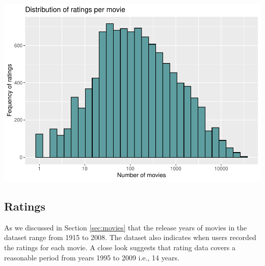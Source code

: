 \documentclass[]{article}
\newenvironment{Shaded}{\begin{snugshade}}{\end{snugshade}}
\newcommand{\CommentTok}[1]{\textcolor[rgb]{0.56,0.35,0.01}{\textit{#1}}}
\newcommand{\DataTypeTok}[1]{\textcolor[rgb]{0.13,0.29,0.53}{#1}}
\newcommand{\DecValTok}[1]{\textcolor[rgb]{0.00,0.00,0.81}{#1}}
\newcommand{\KeywordTok}[1]{\textcolor[rgb]{0.13,0.29,0.53}{\textbf{#1}}}
\newcommand{\NormalTok}[1]{#1}
\newcommand{\OperatorTok}[1]{\textcolor[rgb]{0.81,0.36,0.00}{\textbf{#1}}}
\newcommand{\StringTok}[1]{\textcolor[rgb]{0.31,0.60,0.02}{#1}}
\begin{document}
\begin{Shaded}
\end{Shaded}

\includegraphics{Project_MovieLens_files/figure-latex/unnamed-chunk-12-1.pdf}

\subsection{Ratings}
\label{sec:ratings}

As we discussed in Section \ref{sec:movies} that the release years of
movies in the dataset range from 1915 to 2008. The dataset also
indicates when users recorded the ratings for each movie. A close look
suggests that rating data covers a reasonable period from years 1995 to
2009 i.e., 14 years.
\end{document}

